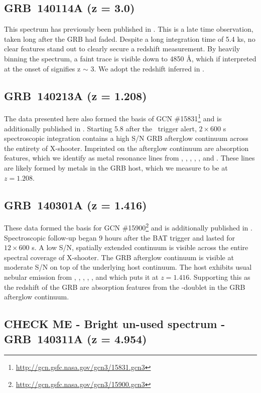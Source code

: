\documentclass{aa}    %
\begin{document}
\subsection{GRB~140114A (z = 3.0)}	

This spectrum has previously been published in \citet{Kruhler2015}. This is a
late time observation, taken long after the GRB had faded. Despite a long
integration time of 5.4 ks, no clear features stand out to clearly secure a
redshift measurement. By heavily binning the spectrum, a faint trace is visible
down to 4850 \AA, which if interpreted at the onset of \lya signifies z $\sim$
3. We adopt the redshift inferred in \citet{Kruhler2015}.

\subsection{GRB~140213A (z = 1.208)}	

The data presented here also formed the basis of GCN
\#15831\footnote{\url{http://gcn.gsfc.nasa.gov/gcn3/15831.gcn3}} and is
additionally published in \citet{Kruhler2015}. Starting 5.8 after the
\swift~trigger alert, $2\times600$ s spectroscopic integration contains a high
S/N GRB afterglow continuum across the entirety of X-shooter. Imprinted on the
afterglow continuum are absorption features, which we identify as metal
resonance lines from \civ, \alii, \aliii, \feii, \mgii, and \mgi. These lines
are likely formed by metals in the GRB host, which we measure to be at $z =
1.208$.

\subsection{GRB~140301A (z = 1.416)}	

These data formed the basis for GCN
\#15900\footnote{\url{http://gcn.gsfc.nasa.gov/gcn3/15900.gcn3}} and is
additionally published in \citet{Kruhler2015}. Spectroscopic follow-up began 9
hours after the BAT trigger and lasted for $12\times600$ s. A low S/N, spatially
extended continuum is visible across the entire spectral coverage of X-shooter.
The GRB afterglow continuum is visible at moderate S/N on top of the underlying
host continuum. The host exhibits usual nebular emission from \oii, \hb, \oiii,
\ha, \nii, and \sii which puts it at $z = 1.416$. Supporting this as the
redshift of the GRB are absorption features from the \mgii-doublet in the GRB
afterglow continuum.

\subsection{CHECK ME - Bright un-used spectrum - GRB~140311A (z = 4.954)}	
\end{document}
